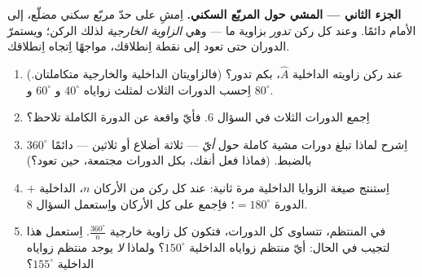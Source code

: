 \begin{problem}
\medskip
\noindent\textbf{الجزء الثاني --- المشي حول المربّع السكني.}
اِمشِ على حدّ مربّع سكني مضلّع، إلى الأمام دائمًا. وعند
كل ركن \emph{تدور} بزاوية ما --- وهي \emph{الزاوية
الخارجية} لذلك الركن؛ ويستمرّ الدوران حتى تعود إلى
نقطة اِنطلاقك، مواجهًا اِتجاه اِنطلاقك.
\begin{enumerate}[resume]
  \item عند ركن زاويته الداخلية $\widehat A$، بكم
        تدور؟ (فالزاويتان الداخلية والخارجية
        متكاملتان.) اِحسب
        الدورات الثلاث لمثلث زواياه $40^\circ$
        و $60^\circ$ و $80^\circ$.
  \item اِجمع الدورات الثلاث في السؤال 6. فأيّ واقعة عن
        الدورة الكاملة تلاحظ؟
  \item اِشرح لماذا تبلغ دورات مشية كاملة حول
        \emph{أيّ}  --- ثلاثة أضلاع أو ثلاثين --- دائمًا
        $360^\circ$ بالضبط. (فماذا فعل أنفك، بكل
        الدورات مجتمعة، حين تعود؟)
  \item اِستنتج صيغة الزوايا الداخلية مرة ثانية: عند كل
        ركن من الأركان $n$، الداخلية $+$ الدورة $= 180^\circ$؛ فاِجمع
        على كل الأركان واِستعمل السؤال 8.
  \item في  المنتظم، تتساوى كل الدورات، فتكون كل
        زاوية خارجية $\frac{360^\circ}{n}$. اِستعمل هذا
        لتجيب في الحال: أيّ  منتظم زواياه
        الداخلية $150^\circ$؟ ولماذا \emph{لا} يوجد 
        منتظم زواياه الداخلية $155^\circ$؟
\end{enumerate}


\end{problem}
